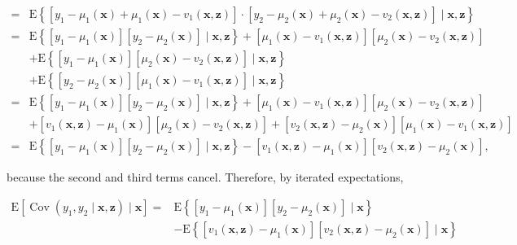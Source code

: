 \documentclass[10pt]{article}
\begin{document}
$$
\begin{aligned}
= & \mathrm{E}\left\{\left[y_{1}-\mu_{1}(\mathbf{x})+\mu_{1}(\mathbf{x})-v_{1}(\mathbf{x}, \mathbf{z})\right] \cdot\left[y_{2}-\mu_{2}(\mathbf{x})+\mu_{2}(\mathbf{x})-v_{2}(\mathbf{x}, \mathbf{z})\right] \mid \mathbf{x}, \mathbf{z}\right\} \\
= & \mathrm{E}\left\{\left[y_{1}-\mu_{1}(\mathbf{x})\right]\left[y_{2}-\mu_{2}(\mathbf{x})\right] \mid \mathbf{x}, \mathbf{z}\right\}+\left[\mu_{1}(\mathbf{x})-v_{1}(\mathbf{x}, \mathbf{z})\right]\left[\mu_{2}(\mathbf{x})-v_{2}(\mathbf{x}, \mathbf{z})\right] \\
& +\mathrm{E}\left\{\left[y_{1}-\mu_{1}(\mathbf{x})\right]\left[\mu_{2}(\mathbf{x})-v_{2}(\mathbf{x}, \mathbf{z})\right] \mid \mathbf{x}, \mathbf{z}\right\} \\
& +\mathrm{E}\left\{\left[y_{2}-\mu_{2}(\mathbf{x})\right]\left[\mu_{1}(\mathbf{x})-v_{1}(\mathbf{x}, \mathbf{z})\right] \mid \mathbf{x}, \mathbf{z}\right\} \\
= & \mathrm{E}\left\{\left[y_{1}-\mu_{1}(\mathbf{x})\right]\left[y_{2}-\mu_{2}(\mathbf{x})\right] \mid \mathbf{x}, \mathbf{z}\right\}+\left[\mu_{1}(\mathbf{x})-v_{1}(\mathbf{x}, \mathbf{z})\right]\left[\mu_{2}(\mathbf{x})-v_{2}(\mathbf{x}, \mathbf{z})\right] \\
& +\left[v_{1}(\mathbf{x}, \mathbf{z})-\mu_{1}(\mathbf{x})\right]\left[\mu_{2}(\mathbf{x})-v_{2}(\mathbf{x}, \mathbf{z})\right]+\left[v_{2}(\mathbf{x}, \mathbf{z})-\mu_{2}(\mathbf{x})\right]\left[\mu_{1}(\mathbf{x})-v_{1}(\mathbf{x}, \mathbf{z})\right] \\
= & \mathrm{E}\left\{\left[y_{1}-\mu_{1}(\mathbf{x})\right]\left[y_{2}-\mu_{2}(\mathbf{x})\right] \mid \mathbf{x}, \mathbf{z}\right\}-\left[v_{1}(\mathbf{x}, \mathbf{z})-\mu_{1}(\mathbf{x})\right]\left[v_{2}(\mathbf{x}, \mathbf{z})-\mu_{2}(\mathbf{x})\right],
\end{aligned}
$$

because the second and third terms cancel. Therefore, by iterated expectations,

$$
\begin{aligned}
\mathrm{E}\left[\operatorname{Cov}\left(y_{1}, y_{2} \mid \mathbf{x}, \mathbf{z}\right) \mid \mathbf{x}\right]= & \mathrm{E}\left\{\left[y_{1}-\mu_{1}(\mathbf{x})\right]\left[y_{2}-\mu_{2}(\mathbf{x})\right] \mid \mathbf{x}\right\} \\
& -\mathrm{E}\left\{\left[v_{1}(\mathbf{x}, \mathbf{z})-\mu_{1}(\mathbf{x})\right]\left[v_{2}(\mathbf{x}, \mathbf{z})-\mu_{2}(\mathbf{x})\right] \mid \mathbf{x}\right\}
\end{aligned}
$$
\end{document}
